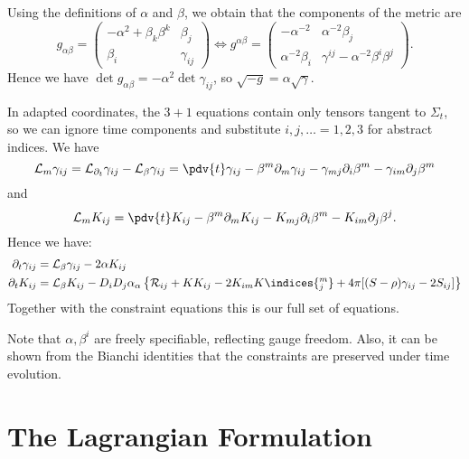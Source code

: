 \documentclass{jknotes}
\begin{document}
Using the definitions of \(\alpha\) and \(\beta\), we obtain that the components of the metric are
\begin{equation}
    g_{\alpha\beta} = 
    \begin{pmatrix}
        -\alpha^2+\beta_k\beta^k & \beta_j \\
        \beta_i & \gamma_{ij}
    \end{pmatrix}
    \iff
    g^{\alpha\beta} = 
    \begin{pmatrix}
        -\alpha^{-2} & \alpha^{-2}\beta_j \\
        \alpha^{-2}\beta_i & \gamma^{ij} - \alpha^{-2}\beta^i\beta^j
    \end{pmatrix}.
\end{equation}
Hence we have \(\det g_{\alpha\beta} = -\alpha^2\det\gamma_{ij}\), so \(\sqrt{-g} = \alpha\sqrt{\gamma}\).

In adapted coordinates, the \(3+1\) equations contain only tensors tangent to \(\Sigma_t\), so we can ignore time components and substitute \(i,j,\dots = 1,2,3\) for abstract indices. We have
\begin{equation}
    \mathcal{L}_m\gamma_{ij}=\mathcal{L}_{\partial_t}\gamma_{ij} - \mathcal{L}_\beta\gamma_{ij} = \pdv{t}\gamma_{ij}-\beta^m\partial_m\gamma_{ij} - \gamma_{mj}\partial_i\beta^m - \gamma_{im}\partial_j\beta^m
\end{equation}
and
\begin{equation}
    \mathcal{L}_m K_{ij} = \pdv{t}K_{ij} - \beta^m\partial_m K_{ij} - K_{mj}\partial_i\beta^m - K_{im}\partial_j\beta^j.
\end{equation}
Hence we have:
\begin{align}
    \partial_t \gamma_{ij} &= \mathcal{L}_\beta\gamma_{ij} - 2\alpha K_{ij} \\
    \partial_t K_{ij} &= \mathcal{L}_\beta K_{ij} - D_iD_j\alpha _ \alpha \left\{\mathcal{R}_{ij}+KK_{ij}-2K_{im}K\indices{^m_j} + 4\pi[(S-\rho)\gamma_{ij}-2S_{ij}]\right\}
\end{align}
Together with the constraint equations this is our full set of equations.

Note that \(\alpha,\beta^i\) are freely specifiable, reflecting gauge freedom. Also, it can be shown from the Bianchi identities that the constraints are preserved under time evolution.

\section{The Lagrangian Formulation}
\end{document}
